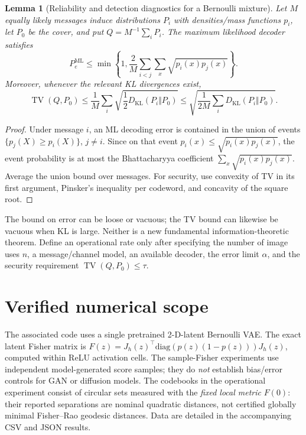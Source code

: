 \documentclass[10pt,a4paper]{article}
\newtheorem{lemma}{Lemma}
\begin{document}
\begin{lemma}[Reliability and detection diagnostics for a Bernoulli mixture]\label{lem:bc}
Let $M$ equally likely messages induce distributions $P_i$ with densities/mass functions $p_i$, let $P_0$ be the cover, and put $Q=M^{-1}\sum_iP_i$. The maximum likelihood decoder satisfies
\begin{equation}
 P_e^{\mathrm{ML}}\le\min\left\{1,\frac{2}{M}\sum_{i<j}\sum_x\sqrt{p_i(x)p_j(x)}\right\}.
\end{equation}
Moreover, whenever the relevant KL divergences exist,
\begin{equation}
 \operatorname{TV}(Q,P_0)\le\frac1M\sum_i\sqrt{\frac12D_{\mathrm{KL}}(P_i\Vert P_0)}\le\sqrt{\frac{1}{2M}\sum_iD_{\mathrm{KL}}(P_i\Vert P_0)}.
\end{equation}
\end{lemma}
\begin{proof}
Under message $i$, an ML decoding error is contained in the union of events $\{p_j(X)\ge p_i(X)\}$, $j\ne i$. Since on that event $p_i(x)\le\sqrt{p_i(x)p_j(x)}$, the event probability is at most the Bhattacharyya coefficient $\sum_x\sqrt{p_i(x)p_j(x)}$. Average the union bound over messages. For security, use convexity of TV in its first argument, Pinsker's inequality per codeword, and concavity of the square root.
\end{proof}
The bound on error can be loose or vacuous; the TV bound can likewise be vacuous when KL is large. Neither is a new fundamental information-theoretic theorem. Define an operational rate only after specifying the number of image uses $n$, a message/channel model, an available decoder, the error limit $\alpha$, and the security requirement $\operatorname{TV}(Q,P_0)\le\tau$.

\section{Verified numerical scope}
The associated code uses a single pretrained 2-D-latent Bernoulli VAE. The exact latent Fisher matrix is $F(z)=J_h(z)^\top\mathrm{diag}(p(z)(1-p(z)))J_h(z)$, computed within ReLU activation cells. The sample-Fisher experiments use independent model-generated score samples; they do \emph{not} establish bias/error controls for GAN or diffusion models. The codebooks in the operational experiment consist of circular sets measured with the \emph{fixed local metric} $F(0)$: their reported separations are nominal quadratic distances, not certified globally minimal Fisher--Rao geodesic distances. Data are detailed in the accompanying CSV and JSON results.
\end{document}
